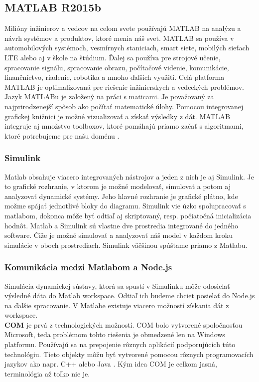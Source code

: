 \subsection{MATLAB R2015b}
Milióny inžinierov a vedcov na celom svete používajú MATLAB na analýzu a návrh systémov a produktov, ktoré menia náš svet. MATLAB sa používa v automobilových systémoch, vesmírnych staniciach, smart siete, mobilých sieťach LTE alebo aj v škole na štúdium. Ďalej sa používa pre strojové učenie, spracovanie signálu, spracovanie obrazu, počítačové videnie, komunikácie, finančníctvo, riadenie, robotika a mnoho ďalšich využití.
Celá platforma MATLAB je optimalizovaná pre riešenie inžinierskych a vedeckých problémov. Jazyk MATLABu je založený na práci s maticami. Je považovaný za najprirodzenejší spôsob ako počítať matematické úlohy. Pomocou integrovanej grafickej knižnici je možné vizualizovať a získať výsledky z dát. MATLAB integruje aj množstvo toolboxov, ktoré pomáhajú priamo začať s algoritmami, ktoré potrebujeme pre našu doménu \cite{matlab-mathworks}.

\subsubsection{Simulink}
Matlab obsahuje viacero integrovaných nástrojov a jeden z nich je aj Simulink. Je to grafické rozhranie, v ktorom je možné modelovať, simulovať a potom aj analyzovať dynamické systémy. Jeho hlavné rozhranie je grafické plátno, kde možme spájať jednotlivé bloky do diagramu. Simulink vie úzko spolupracovať s matlabom, dokonca môže byť odtiaľ aj skriptovaný, resp. počiatočná inicializácia hodnôt. Matlab a Simulink sú vlastne dve prostredia integrované do jedného software. Čiže je možné simulovať a analyzovať náš model v každom kroku simulácie v oboch prostrediach. Simulink väčšinou spúštame priamo z Matlabu.

\subsubsection{Komunikácia medzi Matlabom a Node.js}
Simulácia dynamickej sústavy, ktorá sa spustí v Simulinku môže odosielať výsledné dáta do Matlab workspace. Odtiaľ ich budeme chciet posielať do Node.js na ďalšie spracovanie. V Matlabe existuje viacero možností získania dát z workspace.\\

\textbf{COM} je prvá z technologických možností. COM bolo vytvorené spoločnosťou Microsoft, teda problémom tohto riešenia je obmedzené len na Windows platformu. Používajú sa na prepojenie rôznych aplikácií podporujúcich túto technológiu. Tieto objekty môžu byť vytvorené pomocou rôznych programovacích jazykov ako napr. C++ alebo Java \cite{matlab-microsoft-com}.
Kým idea COM je celkom jasná, terminológia až toľko nie je.

